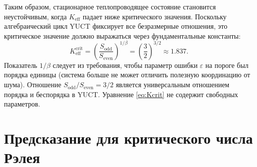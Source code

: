 \documentclass[12pt,a4paper]{article}
\begin{document}
	Таким образом, стационарное теплопроводящее состояние становится неустойчивым, когда \(K_{\mathrm{eff}}\) падает ниже критического значения. Поскольку алгебраический цикл YUCT фиксирует все безразмерные отношения, это критическое значение должно выражаться через фундаментальные константы:
	\begin{equation}\label{eq:Kcrit}
		K_{\mathrm{eff}}^{\mathrm{crit}} = \left( \frac{S_{\mathrm{odd}}}{S_{\mathrm{even}}} \right)^{1/\beta}
		= \left( \frac{3}{2} \right)^{3/2} \approx 1.837.
	\end{equation}
	Показатель \(1/\beta\) следует из требования, чтобы параметр ошибки \(\varepsilon\) на пороге был порядка единицы (система больше не может отличить полезную координацию от шума). Отношение \(S_{\mathrm{odd}}/S_{\mathrm{even}} = 3/2\) является универсальным отношением порядка и беспорядка в YUCT. Уравнение \eqref{eq:Kcrit} не содержит свободных параметров.
	
	\section{Предсказание для критического числа Рэлея}
	
\end{document}
